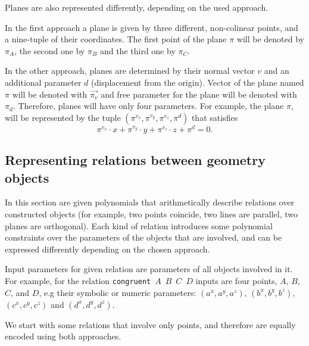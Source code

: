 \documentclass[final,1p,times,authoryear]{elsarticle}
\begin{document}
Planes are also represented differently, depending on the used
approach.

In the first approach a plane is given by three different,
non-colinear points, and a nine-tuple of their coordinates. The first
point of the plane $\pi$ will be denoted by $\pi_A$, the second one by
$\pi_B$ and the third one by $\pi_C$.

In the other approach, planes are determined by their normal vector
$v$ and an additional parameter $d$ (displacement from the
origin). Vector of the plane named $\pi$ will be denoted with
$\overrightarrow{\pi_v}$ and free parameter for the plane will be
denoted with $\pi_d$. Therefore, planes will have only four
parameters. For example, the plane $\pi$, will be represented by the
tuple $(\pi^{v_x}, \pi^{v_y}, \pi^{v_z}, \pi^{d})$ that satisfies
$$\pi^{v_x}\cdot x + \pi^{v_y}\cdot y + \pi^{v_z}\cdot z + \pi^{d} =
0.$$



\subsection{Representing relations between geometry objects}
In this section are given polynomials that arithmetically describe
relations over constructed objects (for example, two points coincide,
two lines are parallel, two planes are orthogonal).  Each kind of
relation introduces some polynomial constraints over the parameters of
the objects that are involved, and can be expressed differently
depending on the chosen approach.

Input parameters for given relation are parameters of all objects
involved in it. For example, for the relation \mbox{{\tt congruent}
  $A$ $B$ $C$ $D$} inputs are four points, $A$, $B$, $C$, and $D$, e.g
their symbolic or numeric parameters: $(a^x, a^y, a^z)$, $(b^x, b^y,
b^z)$, $(c^x, c^y, c^z)$ and $(d^x, d^y, d^z)$.

We start with some relations that involve only points, and therefore
are equally encoded using both approaches.
\end{document}
